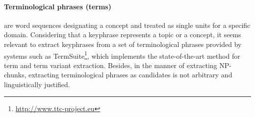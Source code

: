   \paragraph{Terminological phrases (terms)} are word sequences designating a
  concept and treated as single units for a specific domain. Considering that a
  keyphrase represents a topic or a concept, it seems relevant to extract
  keyphrases from  a set of terminological phrases provided by systems such as
  TermSuite\footnote{\url{http://www.ttc-project.eu}}, which implements the
  state-of-the-art method for term and term variant extraction. Besides, in the
  manner of extracting NP-chunks, extracting terminological phrases as
  candidates is not arbitrary and linguistically justified.


